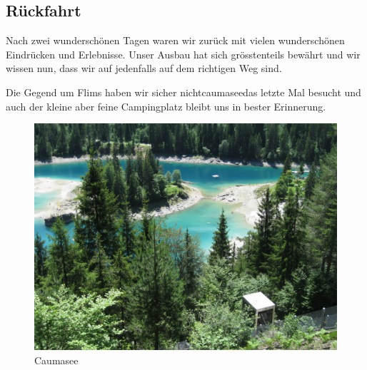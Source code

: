 \subsection{Rückfahrt}
Nach zwei wunderschönen Tagen waren wir zurück mit vielen wunderschönen Eindrücken und Erlebnisse.
Unser Ausbau hat sich grösstenteils bewährt und wir wissen nun, dass wir auf jedenfalls auf dem richtigen Weg sind.

Die Gegend um Flims haben wir sicher nichtcaumaseedas letzte Mal besucht und auch der kleine aber feine Campingplatz bleibt uns in bester Erinnerung.

\begin{figure}[hb]
    \centering
    \includegraphics[width=\textwidth]{../Bilder/Flims/22.jpg}
    \caption{Caumasee}
    \label{img:Flims1}
\end{figure}
